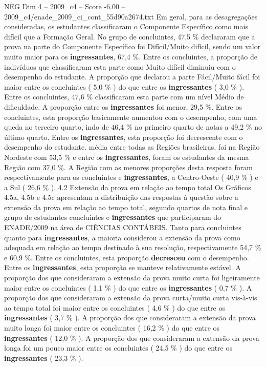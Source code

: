 \begin{textsample}{NEG Dim 4 – 2009\_c4 – Score -6.00 – 2009\_c4/enade\_2009\_ci\_cont\_55d90a2674.txt}
Em geral, para as desagregações consideradas, os estudantes classificaram o Componente Específico como mais difícil que a Formação Geral.
No grupo de concluintes, 47,5 \% declararam que a prova na parte do Componente Específico foi Difícil/Muito difícil, sendo um valor muito maior para os \textbf{ingressantes}, 67,4 \%.
Entre os concluintes, a proporção de indivíduos que classificaram esta parte como Muito difícil diminuiu com o desempenho do estudante.
A proporção que declarou a parte Fácil/Muito fácil foi maior entre os concluintes ( 5,0 \% ) do que entre os \textbf{ingressantes} ( 3,0 \% ).
Entre os concluintes, 47,6 \% classificaram esta parte com um nível Médio de dificuldade.
A proporção entre os \textbf{ingressantes} foi menor, 29,5 \%.
Entre os concluintes, esta proporção basicamente aumentou com o desempenho, com uma queda no terceiro quarto, indo de 46,4 \% no primeiro quarto de notas a 49,2 \% no último quarto.
Entre os \textbf{ingressantes}, esta proporção foi decrescente com o desempenho do estudante. média entre todas as Regiões brasileiras, foi na Região Nordeste com 53,5 \% e entre os \textbf{ingressantes}, foram os estudantes da mesma Região com 37,0 \%.
A Região com as menores proporções desta resposta foram respectivamente para os concluintes e \textbf{ingressantes}, a Centro-Oeste ( 40,9 \% ) e a Sul ( 26,6 \% ). 4.2 Extensão da prova em relação ao tempo total Os Gráficos 4.5a, 4.5b e 4.5c apresentam a distribuição das respostas à questão sobre a extensão da prova em relação ao tempo total, segundo quartos de nota final e grupo de estudantes concluintes e \textbf{ingressantes} que participaram do ENADE/2009 na área de CIÊNCIAS CONTÁBEIS.
Tanto para concluintes quanto para \textbf{ingressantes}, a maioria considerou a extensão da prova como adequada em relação ao tempo destinado à sua resolução, respectivamente 54,7 \% e 60,9 \%.
Entre os concluintes, esta proporção \textbf{decresceu} com o desempenho.
Entre os \textbf{ingressantes}, esta proporção se manteve relativamente estável.
A proporção dos que consideraram a extensão da prova muito curta foi ligeiramente maior entre os concluintes ( 1,1 \% ) do que entre os \textbf{ingressantes} ( 0,7 \% ).
A proporção dos que consideraram a extensão da prova curta/muito curta vis-à-vis ao tempo total foi maior entre os concluintes ( 4,6 \% ) do que entre os \textbf{ingressantes} ( 3,7 \% ).
A proporção dos que consideraram a extensão da prova muito longa foi maior entre os concluintes ( 16,2 \% ) do que entre os \textbf{ingressantes} ( 12,0 \% ).
A proporção dos que consideraram a extensão da prova longa foi um pouco maior entre os concluintes ( 24,5 \% ) do que entre os \textbf{ingressantes} ( 23,3 \% ).

\end{textsample}
